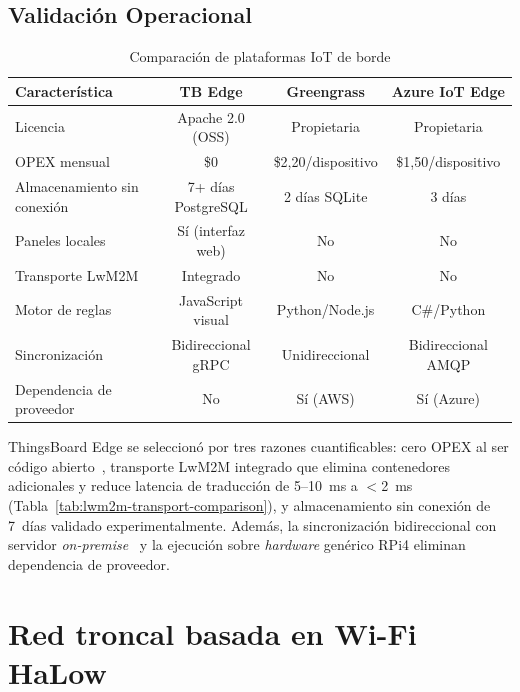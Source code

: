 \subsection{Validación Operacional}
\label{sec:gateway-tb-edge-validacion}

\begin{table}[H]
\centering
\caption{Comparación de plataformas IoT de borde}
\label{tab:edge-features-comparison}
\small
\begin{tabular}{|l|c|c|c|}
\hline
\textbf{Característica} & \textbf{TB Edge} & \textbf{Greengrass} & \textbf{Azure IoT Edge} \\
\hline
Licencia & Apache 2.0 (OSS) & Propietaria & Propietaria \\
OPEX mensual & \$0 & \$2,20/dispositivo & \$1,50/dispositivo \\
Almacenamiento sin conexión & 7+ días PostgreSQL & 2 días SQLite & 3 días \\
Paneles locales & Sí (interfaz web) & No & No \\
Transporte LwM2M & Integrado & No & No \\
Motor de reglas & JavaScript visual & Python/Node.js & C\#/Python \\
Sincronización & Bidireccional gRPC & Unidireccional & Bidireccional AMQP \\
Dependencia de proveedor & No & Sí (AWS) & Sí (Azure) \\
\hline
\end{tabular}
\end{table}

ThingsBoard Edge se seleccionó por tres razones cuantificables: cero OPEX al ser código abierto~\cite{thingsboardEdgeArchitecture2024}, transporte LwM2M integrado que elimina contenedores adicionales y reduce latencia de traducción de 5--10~ms a $<$2~ms (Tabla~\ref{tab:lwm2m-transport-comparison}), y almacenamiento sin conexión de 7~días validado experimentalmente. Además, la sincronización bidireccional con servidor \emph{on-premise}~\cite{thingsboardCloudArchitecture2024} y la ejecución sobre \emph{hardware} genérico RPi4 eliminan dependencia de proveedor.

\section{Red troncal basada en Wi-Fi HaLow}
\label{sec:gateway-halow}
\label{sec:gateway-topologia}

